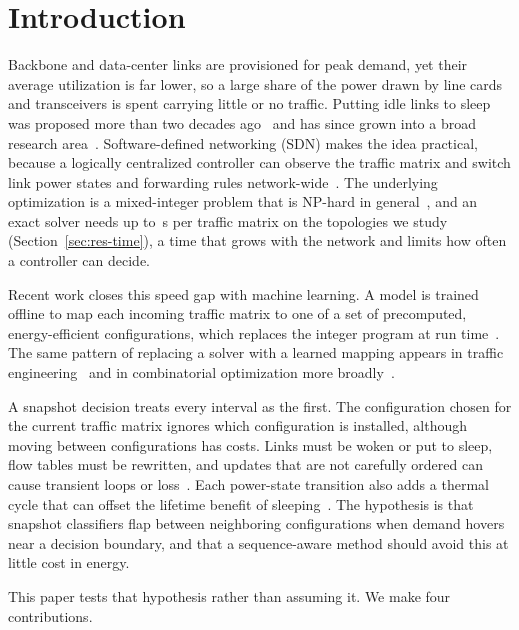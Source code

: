 \documentclass[preprint,12pt]{elsarticle}
\begin{document}
\section{Introduction}

Backbone and data-center links are provisioned for peak demand, yet their average utilization is far lower, so a large share of the power drawn by line cards and transceivers is spent carrying little or no traffic. Putting idle links to sleep was proposed more than two decades ago~\cite{gupta2003greening} and has since grown into a broad research area~\cite{bianzino2012survey,bolla2011energy}. Software-defined networking (SDN) makes the idea practical, because a logically centralized controller can observe the traffic matrix and switch link power states and forwarding rules network-wide~\cite{mckeown2008openflow,kreutz2015sdn}. The underlying optimization is a mixed-integer problem that is NP-hard in general~\cite{chiaraviglio2012minimizing}, and an exact solver needs up to \ilpTA\,s per traffic matrix on the topologies we study (Section~\ref{sec:res-time}), a time that grows with the network and limits how often a controller can decide.

Recent work closes this speed gap with machine learning. A model is trained offline to map each incoming traffic matrix to one of a set of precomputed, energy-efficient configurations, which replaces the integer program at run time~\cite{gomezdelahiz2025noms,gomezdelahiz2026tgcn}. The same pattern of replacing a solver with a learned mapping appears in traffic engineering~\cite{xu2023teal,perry2023dote,abuzaid2021ncflow,almasan2022enero} and in combinatorial optimization more broadly~\cite{bengio2021mlco}.

A snapshot decision treats every interval as the first. The configuration chosen for the current traffic matrix ignores which configuration is installed, although moving between configurations has costs. Links must be woken or put to sleep, flow tables must be rewritten, and updates that are not carefully ordered can cause transient loops or loss~\cite{reitblatt2012abstractions,jin2014dionysus}. Each power-state transition also adds a thermal cycle that can offset the lifetime benefit of sleeping~\cite{chiaraviglio2015lifetime,chiaraviglio2014impact}. The hypothesis is that snapshot classifiers flap between neighboring configurations when demand hovers near a decision boundary, and that a sequence-aware method should avoid this at little cost in energy.

This paper tests that hypothesis rather than assuming it. We make four contributions.
\end{document}
